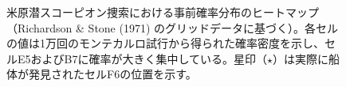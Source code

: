 \begin{figure}[htbp]
    \centering
    \resizebox{0.95\linewidth}{!}{%
    }
    \caption{米原潜スコーピオン捜索における事前確率分布のヒートマップ（Richardson \& Stone (1971) のグリッドデータに基づく）。各セルの値は1万回のモンテカルロ試行から得られた確率密度を示し、セルE5およびB7に確率が大きく集中している。星印（$\star$）は実際に船体が発見されたセルF6の位置を示す。}
    \label{fig:scorpion_prior_heatmap}
\end{figure}


